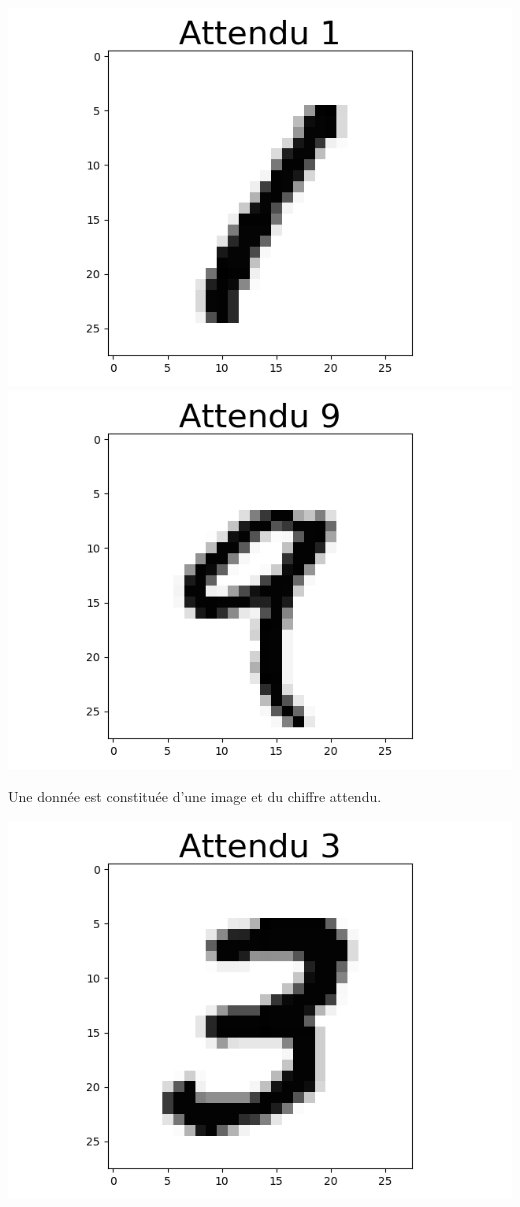 \documentclass[11pt,class=report,crop=false]{standalone}
\begin{document}
\begin{center}
\includegraphics[scale=\myscale,scale=0.20]{figures/tf2-chiffre-train-3}
\includegraphics[scale=\myscale,scale=0.20]{figures/tf2-chiffre-train-4}
\end{center}

Une donnée est constituée d'une image et du chiffre attendu.
\begin{center}
\includegraphics[scale=\myscale,scale=0.5]{figures/tf2-chiffre-train-7}
\end{center}
\end{document}
